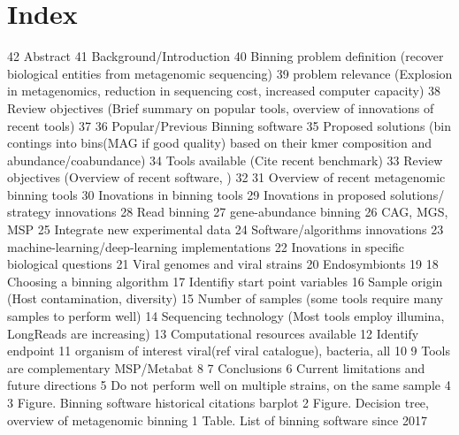 \documentclass{article}
\begin{document}
\section*{Index}
42 Abstract 
 41 Background/Introduction 
 40         Binning problem definition      (recover biological entities from metagenomic sequencing) 
 39                 problem relevance       (Explosion in metagenomics, reduction in sequencing cost, increased computer capacity) 
 38         Review objectives       (Brief summary on popular tools, overview of innovations of recent tools) 
 37  
 36 Popular/Previous Binning software 
 35                 Proposed solutions      (bin contings into bins(MAG if good quality) based on their kmer composition and                              abundance/coabundance) 
 34                 Tools available (Cite recent benchmark) 
 33         Review objectives       (Overview of recent software, ) 
 32  
 31 Overview of recent metagenomic binning tools 
 30         Inovations in binning tools 
 29                 Inovations in proposed solutions/ strategy innovations 
 28                         Read binning 
 27                         gene-abundance binning 
 26                                 CAG, MGS, MSP 
 25                         Integrate new experimental data 
 24                 Software/algorithms innovations 
 23                         machine-learning/deep-learning implementations 
 22         Inovations in specific biological questions 
 21                 Viral genomes and viral strains 
 20                 Endosymbionts 
 19                  
 18 Choosing a binning algorithm 
 17         Identifiy start point variables 
 16                 Sample origin (Host contamination, diversity) 
 15                 Number of samples (some tools require many samples to perform well) 
 14                 Sequencing technology (Most tools employ illumina, LongReads are increasing) 
 13                 Computational resources available 
 12         Identify endpoint 
 11                 organism of interest viral(ref viral catalogue), bacteria, all 
 10                 
  9         Tools are complementary MSP/Metabat 
  8  
  7 Conclusions 
  6         Current limitations and future directions 
  5                 Do not perform well on multiple strains, on the same sample 
  4  
  3 Figure. Binning software historical citations barplot 
  2 Figure. Decision tree, overview of metagenomic binning 
  1 Table. List of binning software since 2017                  
\end{document}
